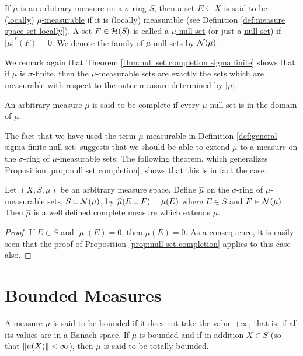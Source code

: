 \begin{definition}
\label{def:general sigma finite null set}
If $\mu$ is an arbitrary measure on a $\sigma$-ring $S$, then a set $E \subseteq X$ is said to be (\underline{locally}) \underline{$\mu$-measurable} if it is (locally) measurable (see Definition \ref{def:measure space set locally}). A set $F \in {\cal H}(S)$ is called a \underline{$\mu$-null set} (or just a \underline{null set}) if $|\mu|^*(F)=0$. We denote the family of $\mu$-null sets by ${\cal N}(\mu)$.
\end{definition}

We remark again that Theorem \ref{thm:null set completion sigma finite} shows that if $\mu$ is $\sigma$-finite, then the $\mu$-measurable sets are exactly the sets which are measurable with respect to the outer measure determined by $|\mu|$.

\begin{definition}
An arbitrary measure $\mu$ is said to be \underline{complete} if every $\mu$-null set is in the domain of $\mu$.
\end{definition}

The fact that we have used the term $\mu$-measurable in Definition \ref{def:general sigma finite null set} suggests that we should be able to extend $\mu$ to a measure on the $\sigma$-ring of $\mu$-measurable sets. The following theorem, which generalizes Proposition \ref{prop:null set completion}, shows that this is in fact the case.

\begin{theorem}
\label{thm:completion of general measure}
Let $(X, S, \mu)$ be an arbitrary measure space. Define $\widehat{\mu}$ on the $\sigma$-ring of $\mu$-measurable sets, $S\sqcup{\cal N}(\mu)$, by $\widehat{\mu}(E\sqcup F)=\mu(E)$ where $E\in S$ and ${F} \in {\cal N}(\mu)$. Then $\widehat{\mu}$ is a well defined complete measure which extends $\mu$.
\end{theorem}

\begin{proof}
If $E \in S$ and $|\mu|(E)=0$, then $\mu(E)=0$. As a consequence, it is easily seen that the proof of Proposition \ref{prop:null set completion} applies to this case also.
\end{proof}

\section{Bounded Measures}
\begin{definition}
A measure $\mu$ is said to be \underline{bounded} if it does not take the value $+\infty$, that is, if all its values are in a Banach space. If $\mu$ is bounded and if in addition $X\in S$ (so that $\norm{\mu(X)}<\infty$), then $\mu$ is said to be \underline{totally bounded}.
\end{definition}


